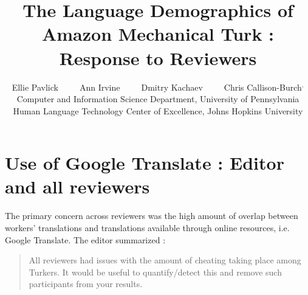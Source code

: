 \documentclass[11pt]{article}
\title{The Language Demographics of  Amazon Mechanical Turk : Response  to Reviewers}
\author{Ellie Pavlick\affliationPenn \ \ \ \ \ Ann Irvine\affliationJHU  \ \ \ \ \ Dmitry Kachaev\affliationJHU  \ \ \ \ \  Chris Callison-Burch\affliationPenn$^{,}$\affliationJHU \\
\affliationPenn Computer and Information Science Department, University of Pennsylvania \\
\affliationJHU Human Language Technology Center of Excellence, Johns Hopkins University \\
  }
\author{}
\date{}
\begin{document}
\maketitle


\section{Use of Google Translate : Editor and all reviewers}

The primary concern across reviewers was the high amount of overlap between workers' translations and translations available through online resources, i.e. Google Translate. The editor summarized : 
\begin{quote}
All reviewers had issues with the amount of cheating taking place among Turkers. It would be useful to quantify/detect this and remove such participants from your results.
\end{quote}
\end{document}
